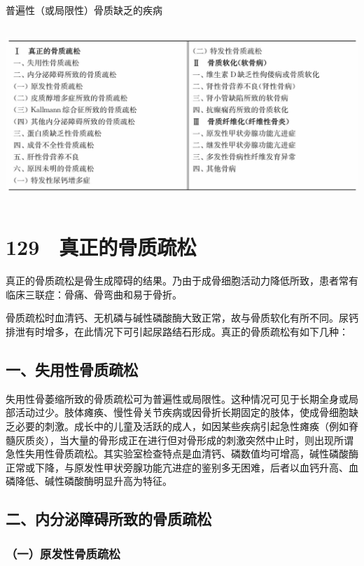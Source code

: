\begin{table}[htbp]
\centering
\caption{普遍性（或局限性）骨质缺乏的疾病}
\label{tab39-2}
\includegraphics[width=5.91667in,height=2.61458in]{./images/Image00245.jpg}
\end{table}

\protect\hypertarget{text00307.html}{}{}

\section{129　真正的骨质疏松}

真正的骨质疏松是骨生成障碍的结果。乃由于成骨细胞活动力降低所致，患者常有临床三联症：骨痛、骨弯曲和易于骨折。

骨质疏松时血清钙、无机磷与碱性磷酸酶大致正常，故与骨质软化有所不同。尿钙排泄有时增多，在此情况下可引起尿路结石形成。真正的骨质疏松有如下几种：

\subsection{一、失用性骨质疏松}

失用性骨萎缩所致的骨质疏松可为普遍性或局限性。这种情况可见于长期全身或局部活动过少。肢体瘫痪、慢性骨关节疾病或因骨折长期固定的肢体，使成骨细胞缺乏必要的刺激。成长中的儿童及活跃的成人，如因某些疾病引起急性瘫痪（例如脊髓灰质炎），当大量的骨形成正在进行但对骨形成的刺激突然中止时，则出现所谓急性失用性骨质疏松。其实验室检查特点是血清钙、磷数值均可增高，碱性磷酸酶正常或下降，与原发性甲状旁腺功能亢进症的鉴别多无困难，后者以血钙升高、血磷降低、碱性磷酸酶明显升高为特征。

\subsection{二、内分泌障碍所致的骨质疏松}

\subsubsection{（一）原发性骨质疏松}

